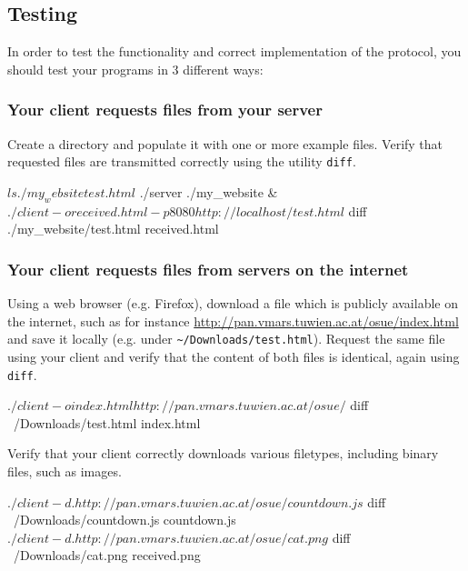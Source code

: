 \clearpage
\subsection*{Testing}

In order to test the functionality and correct implementation of the protocol,
you should test your programs in 3 different ways:

\vspace{-4mm}

\subsubsection*{Your client requests files from your server}

\vspace{-4mm}
Create a directory and populate it with one or more example files.
Verify that requested files are transmitted correctly
using the utility \verb|diff|.

\begin{osuefmtcode}
    $ ls ./my_website
    test.html
    $ ./server ./my_website &
    $ ./client -o received.html -p 8080 http://localhost/test.html
    $ diff ./my_website/test.html received.html
\end{osuefmtcode}

\subsubsection*{Your client requests files from servers on the internet}

\vspace{-4mm}
Using a web browser (e.g. Firefox),
download a file which is publicly available on the internet,
such as for instance \url{http://pan.vmars.tuwien.ac.at/osue/index.html}
and save it locally (e.g. under \verb|~/Downloads/test.html|).
Request the same file using your client
and verify that the content of both files is identical,
again using \verb|diff|.

\begin{osuefmtcode}
    $ ./client -o index.html http://pan.vmars.tuwien.ac.at/osue/
    $ diff ~/Downloads/test.html index.html
\end{osuefmtcode}

Verify that your client correctly downloads various filetypes,
including binary files, such as images.

\begin{osuefmtcode}
    $ ./client -d . http://pan.vmars.tuwien.ac.at/osue/countdown.js
    $ diff ~/Downloads/countdown.js countdown.js
    $ ./client -d . http://pan.vmars.tuwien.ac.at/osue/cat.png
    $ diff ~/Downloads/cat.png received.png
\end{osuefmtcode}

